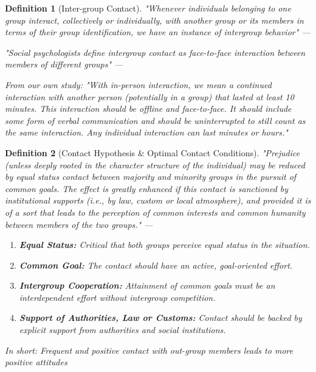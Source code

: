 \documentclass[nobib]{tufte-handout}
\theoremstyle{break}
\newtheorem{definition}{Definition}
\theoremstyle{plain}
\begin{document}
\begin{framed}
    \begin{definition}[Inter-group Contact]
        "Whenever individuals belonging to one group interact, collectively or individually, with another group or its members in terms of their group identification, we have an instance of intergroup behavior" --- \citep[][p. 12]{Sherif1966a}
        
        \vspace{1em}
        \noindent "Social psychologists define intergroup contact as face-to-face interaction between members of different groups" --- \citep[][Chapter 2]{Pettigrew2011}
        
        \vspace{1em}
        \noindent From our own study: "With in-person interaction, we mean a continued interaction with another person (potentially in a group) that lasted at least 10 minutes. This interaction should be offline and face-to-face. It should include some form of verbal communication and should be uninterrupted to still count as the same interaction. Any individual interaction can last minutes or hours."
    \end{definition}  
\end{framed}

\begin{framed}
    \begin{definition}[Contact Hypothesis \& Optimal Contact Conditions]
        "Prejudice (unless deeply rooted in the character structure of the individual) may be reduced by equal status contact between majority and minority groups in the pursuit of common goals. The effect is greatly enhanced if this contact is sanctioned by institutional supports (i.e., by law, custom or local atmosphere), and provided it is of a sort that leads to the perception of common interests and common humanity between members of the two groups." --- \citep[][p. 281]{Allport1954b}
        
        \noindent
        \begin{enumerate}
            \item \textbf{Equal Status:} Critical that both groups perceive equal status in the situation.
            \item \textbf{Common Goal:} The contact should have an active, goal-oriented effort.
            \item \textbf{Intergroup Cooperation:} Attainment of common goals must be an interdependent effort without intergroup competition.
            \item \textbf{Support of Authorities, Law or Customs:} Contact should be backed by explicit support from authorities and social institutions.
        \end{enumerate}
        
        \noindent In short: Frequent and positive contact with out-group members leads to more positive attitudes \citep[][]{Allport1954b, Hewstone1996, Pettigrew1998}
    \end{definition}
\end{framed}
\end{document}
